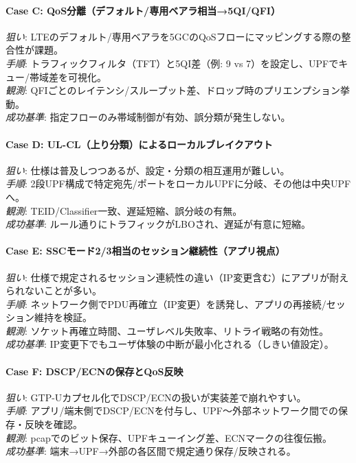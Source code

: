 \paragraph{Case C: QoS分離（デフォルト/専用ベアラ相当→5QI/QFI）}
\textit{狙い}: LTEのデフォルト/専用ベアラを5GCのQoSフローにマッピングする際の整合性が課題。\\
\textit{手順}: トラフィックフィルタ（TFT）と5QI差（例: 9 vs 7）を設定し、UPFでキュー/帯域差を可視化。\\
\textit{観測}: QFIごとのレイテンシ/スループット差、ドロップ時のプリエンプション挙動。\\
\textit{成功基準}: 指定フローのみ帯域制御が有効、誤分類が発生しない。

\paragraph{Case D: UL-CL（上り分類）によるローカルブレイクアウト}
\textit{狙い}: 仕様は普及しつつあるが、設定・分類の相互運用が難しい。\\
\textit{手順}: 2段UPF構成で特定宛先/ポートをローカルUPFに分岐、その他は中央UPFへ。\\
\textit{観測}: TEID/Classifier一致、遅延短縮、誤分岐の有無。\\
\textit{成功基準}: ルール通りにトラフィックがLBOされ、遅延が有意に短縮。

\paragraph{Case E: SSCモード2/3相当のセッション継続性（アプリ視点）}
\textit{狙い}: 仕様で規定されるセッション連続性の違い（IP変更含む）にアプリが耐えられないことが多い。\\
\textit{手順}: ネットワーク側でPDU再確立（IP変更）を誘発し、アプリの再接続/セッション維持を検証。\\
\textit{観測}: ソケット再確立時間、ユーザレベル失敗率、リトライ戦略の有効性。\\
\textit{成功基準}: IP変更下でもユーザ体験の中断が最小化される（しきい値設定）。

\paragraph{Case F: DSCP/ECNの保存とQoS反映}
\textit{狙い}: GTP-Uカプセル化でDSCP/ECNの扱いが実装差で崩れやすい。\\
\textit{手順}: アプリ/端末側でDSCP/ECNを付与し、UPF～外部ネットワーク間での保存・反映を確認。\\
\textit{観測}: pcapでのビット保存、UPFキューイング差、ECNマークの往復伝搬。\\
\textit{成功基準}: 端末→UPF→外部の各区間で規定通り保存/反映される。

